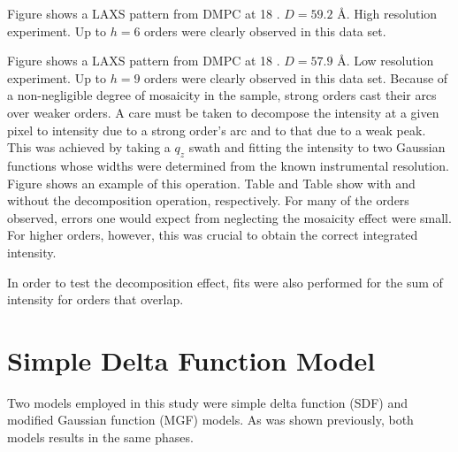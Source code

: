\documentclass[12pt,letterpaper]{article}
\begin{document}
Figure shows a LAXS pattern from DMPC at 18 \degC. $D=59.2$ \AA. High 
resolution experiment. Up to $h=6$ orders were clearly observed in this
data set. 

Figure shows a LAXS pattern from DMPC at 18 \degC. $D=57.9$ \AA. Low
resolution experiment. Up to $h=9$ orders were clearly observed in this
data set. Because of a non-negligible degree of mosaicity in the sample,
strong orders cast their arcs over weaker orders. A care must be 
taken to decompose the intensity at a given pixel to intensity due to
a strong order's arc and to that due to a weak peak. This was achieved
by taking a $q_z$ swath and fitting the intensity to two Gaussian
functions whose widths were determined from the known instrumental 
resolution. Figure shows an example of this operation. Table and
Table show with and without the decomposition operation, respectively. 
For many of the orders observed, errors one would expect from 
neglecting the mosaicity effect were small. For higher orders, however,
this was crucial to obtain the correct integrated intensity.

In order to test the decomposition effect, fits were also performed
for the sum of intensity for orders that overlap. 

\section{Simple Delta Function Model}
Two models employed in this study were simple delta function (SDF) and
modified Gaussian function (MGF) models. As was shown previously,
both models results in the same phases.
\end{document}
